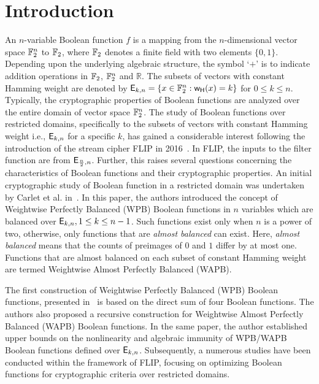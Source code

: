 \documentclass{llncs}
\begin{document}
\section{Introduction}
An $n$-variable Boolean function $f$ is a mapping from the $n$-dimensional vector space $\mathbb{F}_2^n$ to $\mathbb{F}_2$, where $\mathbb{F}_2$ denotes a finite field with two elements $\{0,1\}$. Depending upon the underlying algebraic structure, the symbol `$+$' is to indicate addition operations in $\mathbb{F}_2$, $\mathbb{F}_2^n$ and $\mathbb{R}$. The subsets of vectors with constant Hamming weight are denoted by $\mathsf{E}_{k,n} = \{x \in \mathbb{F}_2^n : \mathsf{w_H}(x)=k\}$ for $0 \leq k \leq n$.
Typically, the cryptographic properties of Boolean functions are analyzed over the entire domain of vector space $\mathbb{F}_2^n$. The study of Boolean functions over restricted domains, specifically to the subsets of vectors with constant Hamming weight i.e., $\mathsf{E}_{k,n}$ for a specific $k$, has gained a considerable interest following the introduction of the stream cipher FLIP in 2016~\cite{EC:MJSC16}.
In FLIP, the inputs to the filter function are from $\mathsf{E}_{\frac{n}{2},n}$. Further, this raises several questions concerning the characteristics of Boolean functions and their cryptographic properties. An initial cryptographic study of Boolean function in a restricted domain was undertaken by Carlet et al. in~\cite{TOSC:CarMeaRot17}. In this paper, the authors introduced the concept of Weightwise Perfectly Balanced (WPB) Boolean functions in $n$ variables which are balanced over $\mathsf{E}_{k,n}, 1 \leq k \leq n-1$. Such functions exist only when $n$ is a power of two,  otherwise, only functions that are \textit{almost balanced} can exist. Here, \textit{almost balanced} means that the counts of preimages of $0$ and $1$ differ by at most one. Functions that are almost balanced on each subset of constant Hamming weight are termed Weightwise Almost Perfectly Balanced (WAPB). 

The first construction of Weightwise Perfectly Balanced (WPB) Boolean functions, presented in~\cite{TOSC:CarMeaRot17} is based on the direct sum of four Boolean functions.  The authors also proposed a recursive construction for Weightwise Almost Perfectly Balanced (WAPB) Boolean functions. 
In the same paper, the author established upper bounds on the nonlinearity and algebraic immunity of WPB/WAPB Boolean functions defined over $\mathsf{E}_{k,n}$. Subsequently, a numerous studies have been conducted within the framework of FLIP, focusing on optimizing Boolean functions for cryptographic criteria over restricted domains.
\end{document}
